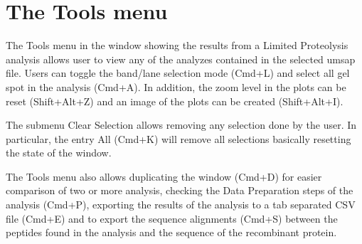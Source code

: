 \section{The Tools menu}
\label{sec:limprotToolsMenu}

The Tools menu in the window showing the results from a Limited Proteolysis analysis
allows user to view any of the analyzes contained in the selected umsap file. Users
can toggle the band/lane selection mode (Cmd+L) and select all gel spot in the analysis
(Cmd+A). In addition, the zoom level in the plots can be reset (Shift+Alt+Z) and
an image of the plots can be created (Shift+Alt+I).

The submenu Clear Selection allows removing any selection done by the user. In
particular, the entry All (Cmd+K) will remove all selections basically resetting
the state of the window.

The Tools menu also allows duplicating the window (Cmd+D) for easier comparison of
two or more analysis, checking the Data Preparation steps of the analysis (Cmd+P),
exporting the results of the analysis to a tab separated CSV file (Cmd+E) and to
export the sequence alignments (Cmd+S) between the peptides found in the analysis
and the sequence of the recombinant protein.